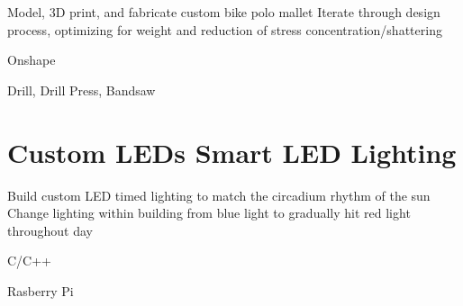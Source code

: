 \vspace{-2.5ex}

\begin{detail}
    \BulletItem
    Model, 3D print, and fabricate custom bike polo mallet
    \BulletItem
    Iterate through design process, optimizing for weight and reduction of stress concentration/shattering
\end{detail}

\begin{subtitle}
    \vspace{-5ex}
    {{}} 
\end{subtitle}

\vspace{-1.5ex}
{
    \vspace{-0.8ex}
    \color{cyan}\small
    {Onshape} %
}

{
    \vspace{-2.5ex}\hspace{1.5in}
    \color{cyan}\small
    {Drill, Drill Press, Bandsaw} %
}

\vspace{0.5ex}



\section{
    \textbf{Custom LEDs} \newline
    Smart LED Lighting
}{}

\vspace{-2.5ex}

\begin{detail}
    \BulletItem
    Build custom LED timed lighting to match the circadium rhythm of the sun 
    \BulletItem
    Change lighting within building from blue light to gradually hit red light throughout day
\end{detail}

\begin{subtitle}
    \vspace{-5ex}
    {{}} 
\end{subtitle}

\vspace{-1.5ex}
{
    \vspace{-0.8ex}
    \color{cyan}\small
    {C/C++} %
}

{
    \vspace{-2.5ex}\hspace{1.5in}
    \color{cyan}\small
    {Rasberry Pi} %
}

